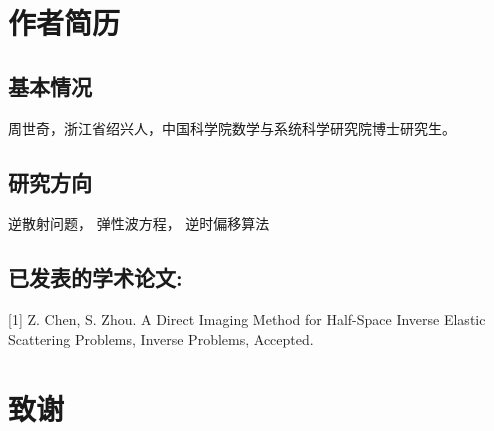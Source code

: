\chapter{作者简历}



\section*{基本情况}


周世奇，浙江省绍兴人，中国科学院数学与系统科学研究院博士研究生。

\section*{研究方向}

逆散射问题， 弹性波方程， 逆时偏移算法


\section*{已发表的学术论文:}

[1] Z. Chen, S. Zhou. A Direct Imaging Method for Half-Space Inverse
Elastic Scattering Problems, Inverse Problems, Accepted.



\chapter[致谢]{致\quad 谢}%
\thispagestyle{noheaderstyle}%



\cleardoublepage[plain]%

